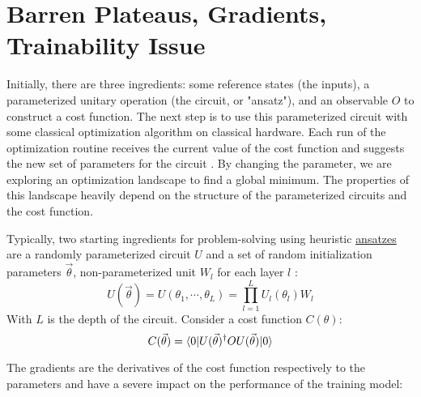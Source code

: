 \section{Barren Plateaus, Gradients, Trainability Issue}
Initially, there are three ingredients: some reference states (the inputs), a parameterized unitary operation (the circuit, or "ansatz"), and an observable $O$ to construct a cost function.
The next step is to use this parameterized circuit with some classical optimization algorithm on classical hardware.
Each run of the optimization routine receives the current value of the cost function and suggests the new set of parameters for the circuit \cite{cerezo2021variational}.
By changing the parameter, we are exploring an optimization landscape to find a global minimum.
The properties of this landscape heavily depend on the structure of the parameterized circuits and the cost function.

Typically, two starting ingredients for problem-solving using heuristic \underline{ansatzes} are a randomly parameterized circuit $U$ and a set of random initialization parameters $\vec{\theta}$, non-parameterized unit $W_l$ for each layer $l$ \cite{mccleanBarrenPlateausQuantum2018}:
\begin{equation}\label{Parameterized Circuit}
    U(\vec{\theta})
    = U(\theta_1, \cdots, \theta_L)
    = \prod_{l=1}^L U_l(\theta_l)W_l
\end{equation}
With $L$ is the depth of the circuit. Consider a cost function $C(\theta)$:
\begin{equation}\label{Cost function}
    C(\vec{\theta})
    = \bra{0} U(\vec{\theta})^\dagger OU(\vec{\theta}) \ket{0}
\end{equation}

The gradients are the derivatives of the cost function respectively to the parameters and have a severe impact on the performance of the training model:

